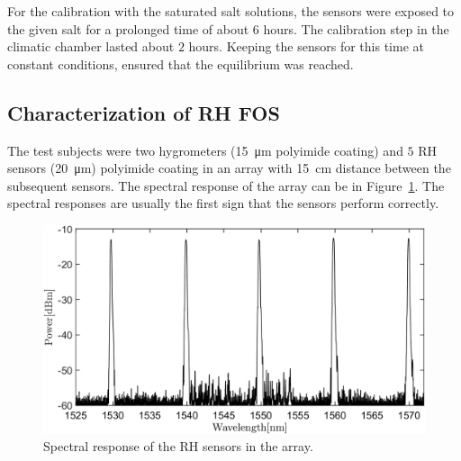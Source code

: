 For the calibration with the saturated salt solutions, the sensors were exposed to the given salt for a prolonged time of about $6$ hours. The calibration step in the climatic chamber lasted about $2$ hours. Keeping the sensors for this time at constant conditions, ensured that the equilibrium was reached. 
\subsection{Characterization of RH FOS}

The test subjects were two hygrometers (\SI{15}{\micro\metre} polyimide coating) and  $5$ \gls{RH} sensors (\SI{20}{\micro\metre}) polyimide coating in an array with \SI{15}{\cm} distance between the subsequent sensors. The spectral response of the array can be in Figure~\ref{fig_array_wavelength}. The spectral responses are usually the first sign that the sensors perform correctly. 

\begin{figure}[!h]
\centering
\includegraphics[width=0.85\columnwidth]{Chapter5/images/rh_array.png}
\caption{Spectral response of the RH sensors in the array.}
\label{fig_array_wavelength}
\end{figure}

